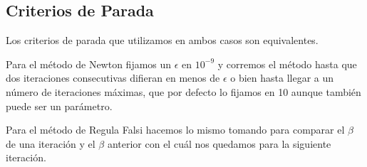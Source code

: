\subsection{Criterios de Parada}

Los criterios de parada que utilizamos en ambos casos son equivalentes.

Para el m\'etodo de Newton fijamos un $\epsilon$ en $10^{-9}$ y corremos el m\'etodo hasta que dos iteraciones consecutivas difieran en menos de $\epsilon$ o bien hasta llegar a un n\'umero de iteraciones m\'aximas, que por defecto lo fijamos en 10 aunque tambi\'en puede ser un par\'ametro.

Para el m\'etodo de Regula Falsi hacemos lo mismo tomando para comparar el $\beta$ de una iteraci\'on y el $\beta$ anterior con el cu\'al nos quedamos para la siguiente iteraci\'on. 